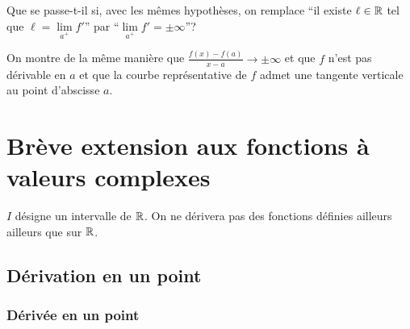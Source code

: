 Que se passe-t-il si, avec les mêmes hypothèses, on remplace ``il existe \(\ell
\in \mathbb{R}\) tel que \(\ell=\lim\limits_{a^+}f'\)'' par ``\(\lim\limits_{a^+} f'=\pm
\infty\)''?

On montre de la même manière que \(\frac{f(x)-f(a)}{x-a} \to \pm \infty\) et que
\(f\) n'est pas dérivable en \(a\) et que la courbe représentative de \(f\)
admet une tangente verticale au point d'abscisse \(a\).

\section{Brève extension aux fonctions à valeurs complexes}

\(I\) désigne un intervalle de \(\mathbb{R}\). On ne dérivera pas des fonctions définies
ailleurs ailleurs que sur \(\mathbb{R}\).

\subsection{Dérivation en un point}

\subsubsection{Dérivée en un point}

